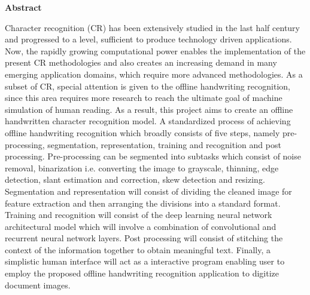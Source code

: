 \documentclass[main.tex]{subfiles}
\begin{document}
\begin{flushleft}
\Large{\bf{Abstract}}
\end{flushleft}
\vspace{1.5mm}
\justify
\normalsize{Character recognition (CR) has been extensively studied in the last
half century and progressed to a level, sufficient to produce technology driven
applications. Now, the rapidly growing computational power enables the
implementation of the present CR methodologies and also creates an increasing
demand in many emerging application domains, which require more advanced
methodologies. As a subset of CR, special attention is given to the offline
handwriting recognition, since this area requires more research to reach the
ultimate goal of machine simulation of human reading. As a result, this project
aims to create an offline handwritten character recognition model. A
standardized process of achieving offline handwriting recognition which broadly
consists of five steps, namely pre-processing, segmentation, representation,
training and recognition and post processing. Pre-processing can be segmented 
into subtasks which consist of noise removal, binarization i.e. converting the 
image to grayscale, thinning, edge detection, slant estimation and correction, 
skew detection and resizing. Segmentation and representation will consist of 
dividing the cleaned image for feature extraction and then arranging the
divisions into a standard format. Training and recognition will consist of the
deep learning neural network architectural model which will involve a 
combination of convolutional and recurrent neural network layers. Post
processing will consist of stitching the context of the information together to
obtain meaningful text. Finally, a simplistic human interface will act as a 
interactive program enabling user to employ the proposed offline handwriting
recognition application to digitize document images.
}
\end{document}
